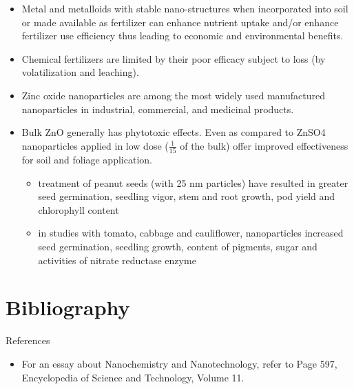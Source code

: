 \documentclass[11pt,dvipsnames,ignorenonframetext,aspectratio=169]{beamer}
\newif\ifbibliography
\providecommand{\tightlist}{%
  \setlength{\itemsep}{0pt}\setlength{\parskip}{0pt}}
\begin{document}
\begin{frame}{}
\protect\hypertarget{section-4}{}
\small

\begin{itemize}
\tightlist
\item
  Metal and metalloids with stable nano-structures when incorporated
  into soil or made available as fertilizer can enhance nutrient uptake
  and/or enhance fertilizer use efficiency thus leading to economic and
  environmental benefits.
\item
  Chemical fertilizers are limited by their poor efficacy subject to
  loss (by volatilization and leaching).
\item
  Zinc oxide nanoparticles are among the most widely used manufactured
  nanoparticles in industrial, commercial, and medicinal products.
\item
  Bulk ZnO generally has phytotoxic effects. Even as compared to ZnSO4
  nanoparticles applied in low dose (\(\frac{1}{15}\) of the bulk) offer
  improved effectiveness for soil and foliage application.

  \begin{itemize}
  \footnotesize  
  \item treatment of peanut seeds (with 25 nm particles) have resulted in greater seed germination, seedling vigor, stem and root growth, pod yield and chlorophyll content
  \item in studies with tomato, cabbage and cauliflower, nanoparticles increased seed germination, seedling growth, content of pigments, sugar and activities of nitrate reductase enzyme
  \end{itemize}
\end{itemize}
\end{frame}

\hypertarget{bibliography}{%
\section{Bibliography}\label{bibliography}}

\begin{frame}{References}
\protect\hypertarget{references}{}
\begin{itemize}
\tightlist
\item
  For an essay about Nanochemistry and Nanotechnology, refer to Page
  597, Encyclopedia of Science and Technology, Volume 11.
\end{itemize}
\end{frame}

          \begin{frame}[allowframebreaks]{}
    \bibliographytrue
    
    \end{frame}
  
\end{document}
